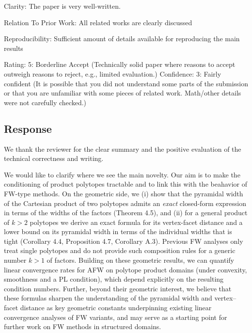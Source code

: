 \documentclass[a4wide]{article}
\begin{document}
Clarity:
The paper is very well-written.

Relation To Prior Work: All related works are clearly discussed

Reproducibility: Sufficient amount of details available for reproducing the main results

Rating: 5: Borderline Accept (Technically solid paper where reasons to accept outweigh reasons to reject, e.g., limited evaluation.)
Confidence: 3: Fairly confident (It is possible that you did not understand some parts of the submission or that you are unfamiliar with some pieces of related work. Math/other details were not carefully checked.)

\subsection*{Response}

We thank the reviewer for the clear summary and the positive evaluation of the technical correctness and writing.

We would like to clarify where we see the main novelty. Our aim is to make the conditioning of product polytopes tractable and to link this with the beahavior of FW-type methods. On the geometric side, we (i) show that the pyramidal width of the Cartesian product of two polytopes admits an \emph{exact} closed-form expression in terms of the widths of the factors (Theorem 4.5), and (ii) for a general product of $k>2$ polytopes we derive an exact formula for its vertex-facet distance and a lower bound on its pyramidal width in terms of the individual widths that is tight (Corollary 4.4, Proposition 4.7, Corollary A.3).
Previous FW analyses only treat single polytopes and do not provide such composition rules for a generic number $k>1$ of factors. Building on these geometric results, we can quantify linear convergence rates for AFW on polytope product domains (under convexity, smoothness and a PL condition), which depend explicitly on the resulting condition numbers.
Further, beyond their geometric interest, we believe that these formulas sharpen the understanding of the pyramidal width and vertex–facet distance as key geometric constants underpinning existing linear convergence analyses of FW variants, and may serve as a starting point for further work on FW methods in structured domains.
\end{document}

